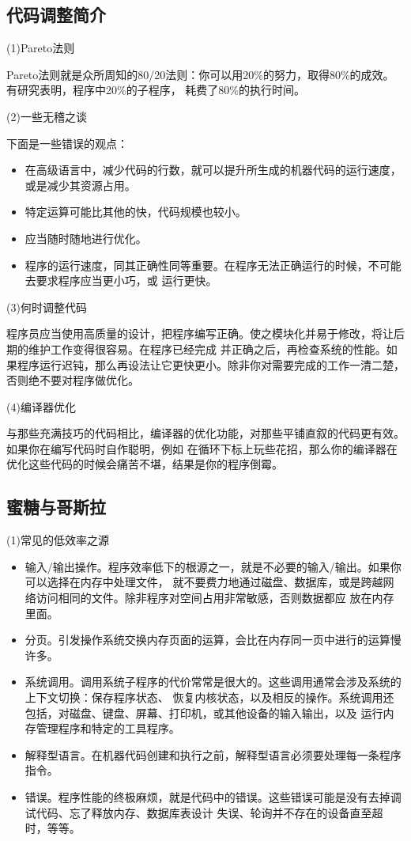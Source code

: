 \documentclass{article}
\begin{document}
\subsection{代码调整简介}
\par
(1)Pareto法则
\par
Pareto法则就是众所周知的80/20法则：你可以用20\%的努力，取得80\%的成效。有研究表明，程序中20\%的子程序，
耗费了80\%的执行时间。

\par
(2)一些无稽之谈
\par
下面是一些错误的观点：
\begin{itemize}
    \item 在高级语言中，减少代码的行数，就可以提升所生成的机器代码的运行速度，或是减少其资源占用。
    \item 特定运算可能比其他的快，代码规模也较小。
    \item 应当随时随地进行优化。
    \item 程序的运行速度，同其正确性同等重要。在程序无法正确运行的时候，不可能去要求程序应当更小巧，或
    运行更快。
\end{itemize}

\par
(3)何时调整代码
\par
程序员应当使用高质量的设计，把程序编写正确。使之模块化并易于修改，将让后期的维护工作变得很容易。在程序已经完成
并正确之后，再检查系统的性能。如果程序运行迟钝，那么再设法让它更快更小。除非你对需要完成的工作一清二楚，
否则绝不要对程序做优化。

\par
(4)编译器优化
\par
与那些充满技巧的代码相比，编译器的优化功能，对那些平铺直叙的代码更有效。如果你在编写代码时自作聪明，例如
在循环下标上玩些花招，那么你的编译器在优化这些代码的时候会痛苦不堪，结果是你的程序倒霉。

\subsection{蜜糖与哥斯拉}
\par
(1)常见的低效率之源
\par
\begin{itemize}
    \item 输入/输出操作。程序效率低下的根源之一，就是不必要的输入/输出。如果你可以选择在内存中处理文件，
    就不要费力地通过磁盘、数据库，或是跨越网络访问相同的文件。除非程序对空间占用非常敏感，否则数据都应
    放在内存里面。
    \item 分页。引发操作系统交换内存页面的运算，会比在内存同一页中进行的运算慢许多。
    \item 系统调用。调用系统子程序的代价常常是很大的。这些调用通常会涉及系统的上下文切换：保存程序状态、
    恢复内核状态，以及相反的操作。系统调用还包括，对磁盘、键盘、屏幕、打印机，或其他设备的输入输出，以及
    运行内存管理程序和特定的工具程序。
    \item 解释型语言。在机器代码创建和执行之前，解释型语言必须要处理每一条程序指令。
    \item 错误。程序性能的终极麻烦，就是代码中的错误。这些错误可能是没有去掉调试代码、忘了释放内存、数据库表设计
    失误、轮询并不存在的设备直至超时，等等。
\end{itemize}
\end{document}
